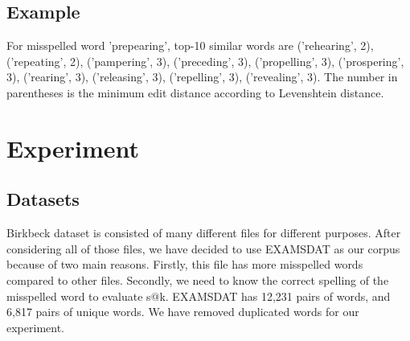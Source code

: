 \documentclass[sigconf]{acmart}
\begin{document}
\subsection{Example}
For misspelled word 'prepearing', top-10 similar words are ('rehearing', 2), ('repeating', 2), ('pampering', 3), ('preceding', 3), ('propelling', 3), ('prospering', 3), ('rearing', 3), ('releasing', 3), ('repelling', 3), ('revealing', 3). The number in parentheses is the minimum edit distance according to Levenshtein distance.
\section{Experiment}
\subsection{Datasets}
Birkbeck dataset is consisted of many different files for different purposes. After considering all of those files, we have decided to use EXAMSDAT as our corpus because of two main reasons. Firstly, this file has more misspelled words compared to other files. Secondly, we need to know the correct spelling of the misspelled word to evaluate s@k. EXAMSDAT has 12,231 pairs of words, and 6,817 pairs of unique words. We have removed duplicated words for our experiment.
\end{document}
